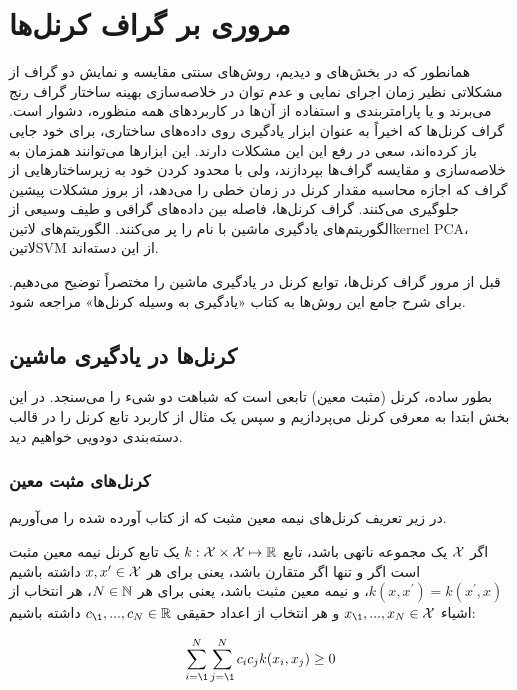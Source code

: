 \section{مروری بر گراف کرنل‌ها}\label{sec:graph-kernels-review}
همانطور که در بخش‌های  و  دیدیم، روش‌های سنتی مقایسه و نمایش دو گراف از مشکلاتی نظیر زمان اجرای نمایی و عدم توان در خلاصه‌سازی بهینه ساختار گراف رنج می‌برند و یا پارامتربندی و استفاده از آن‌ها در کاربردهای همه منظوره، دشوار است. گراف کرنل‌ها که اخیراً به عنوان ابزار یادگیری روی داده‌های ساختاری، برای خود جایی باز کرده‌اند، سعی در رفع این این مشکلات دارند. این ابزارها می‌توانند همزمان به خلاصه‌سازی و مقایسه گراف‌ها بپردازند، ولی با محدود کردن خود به زیرساختارهایی از گراف که اجازه محاسبه مقدار کرنل در زمان خطی را می‌دهد، از بروز مشکلات پیشین جلوگیری می‌کنند. گراف کرنل‌ها، فاصله بین داده‌های گرافی و طیف وسیعی از الگوریتم‌های یادگیری ماشین با نام  را پر می‌کنند. الگوریتم‌های ‌لاتین{kernel PCA}، ‌لاتین{SVM} از این دسته‌اند.

قبل از مرور گراف کرنل‌ها، توابع کرنل در یادگیری ماشین را مختصراً توضیح می‌دهیم. برای شرح جامع این روش‌ها به کتاب «یادگیری به وسیله کرنل‌ها» مراجعه شود.

\subsection{کرنل‌ها در یادگیری ماشین}
بطور ساده، کرنل (مثبت معین) تابعی است که شباهت دو شیء را می‌سنجد. در این بخش ابتدا به معرفی کرنل می‌پردازیم و سپس یک مثال از کاربرد تابع کرنل را در قالب دسته‌بندی دودویی خواهیم دید.

\subsubsection{کرنل‌های مثبت معین}\label{sec:positive-semidefinite-kernels}
در زیر تعریف کرنل‌های نیمه معین مثبت که از کتاب  آورده شده را می‌آوریم.
\begin{definition}
اگر $\mathcal{X}$ یک مجموعه ناتهی باشد، تابع $k: \mathcal{X} \times \mathcal{X} \mapsto \mathbb{R}$ یک تابع کرنل نیمه معین مثبت است اگر و تنها اگر متقارن باشد، یعنی برای هر $x,x^\prime \in \mathcal{X}$ داشته باشیم
$k(x,x^\prime) = k(x^\prime,x)$، و نیمه معین مثبت باشد، 
یعنی برای هر $N \in \mathbb{N}$، هر انتخاب از اشیاء $x_\1,...,x_N \in \mX$ و هر انتخاب از اعداد حقیقی $c_\1,...,c_N \in \R$ داشته باشیم:

\begin{equation*}
\sum_{i=\1}^{N}\sum_{j=\1}^{N}c_ic_jk(x_i,x_j) \geq 0
\end{equation*}
\end{definition}


